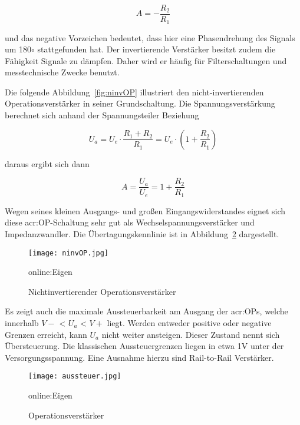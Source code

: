 \begin{equation}
	\label{equ:bsp1}
	A = - \frac{R_{2}}{R_{1}}
\end{equation}

und das negative Vorzeichen bedeutet, dass hier eine Phasendrehung des Signals um 180$\circ$ stattgefunden hat. Der invertierende Verstärker besitzt zudem die Fähigkeit Signale zu dämpfen. Daher wird er häufig für Filterschaltungen und messtechnische Zwecke benutzt. 

Die folgende Abbildung~\ref{fig:ninvOP} illustriert den nicht-invertierenden Operationsverstärker in seiner Grundschaltung. Die Spannungsverstärkung berechnet sich anhand der Spannungsteiler Beziehung

\begin{equation}
	\label{equ:bsp1}
	U_{a} = U_{e} \cdot \frac{R_{1} + R_{2}}{R_{1}} = U_{e} \cdot (1+ \frac{R_{2}}{R_{1}})
\end{equation}

daraus ergibt sich dann

\begin{equation}
	\label{equ:bsp1}
	A = \frac{U_{a}}{U_{e}} = 1+ \frac{R_{2}}{R_{1}}
\end{equation}

Wegen seines kleinen Ausgangs- und großen Eingangswiderstandes eignet sich diese \gls{acr:OP}-Schaltung sehr gut als  Wechselspannungsverstärker und Impedanzwandler. Die Übertagungskennlinie ist in Abbildung~\ref{fig:aussteuer} dargestellt. 

\begin{figure}[H]
	\centering
	\texttt{[image: ninvOP.jpg]}
	\caption[Nichtinvertierender Operationsverstärker]{Nichtinvertierender Operationsverstärker} 
	\gls{online:Eigen}
	\label{fig:invOP}
\end{figure}

Es zeigt auch die maximale Aussteuerbarkeit am Ausgang der \gls{acr:OP}s, welche innerhalb $V-$ < $U_{a}$ < $V+$ liegt. Werden entweder positive oder negative Grenzen erreicht, kann $U_{a}$ nicht weiter ansteigen. Dieser Zustand nennt sich Übersteuerung. Die klassischen Aussteuergrenzen liegen in etwa 1V unter der Versorgungsspannung.\cite{OP} Eine Ausnahme hierzu sind Rail-to-Rail Verstärker. 

\begin{figure}[H]
	\centering
	\texttt{[image: aussteuer.jpg]}
	\caption[Operationsverstärker]{Operationsverstärker} 
	\gls{online:Eigen}
	\label{fig:aussteuer}
\end{figure} 

